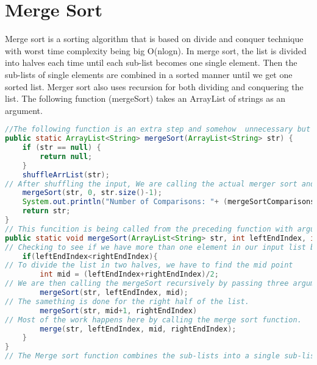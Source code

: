 \documentclass{article}
\begin{document}
\section{Merge Sort}
Merge sort is a sorting algorithm that is based on divide and conquer technique with worst time complexity being big O(nlogn). In merge sort, the list is divided into halves each time until each sub-list becomes one single element. Then the sub-lists of single elements are combined in a sorted manner until we get one sorted list. Merger sort also uses recursion for both dividing and conquering the list. The following function (mergeSort) takes an ArrayList of strings as an argument. 
\begin{lstlisting}[language=Java]
//The following function is an extra step and somehow  unnecessary but I used it to make the program readable and easy to follow. So the function just takes an ArrayList of Strings as an input. 
public static ArrayList<String> mergeSort(ArrayList<String> str) {
    if (str == null) {
        return null;
    }
    shuffleArrList(str);
// After shuffling the input, We are calling the actual merger sort and passing three arguments. The first one is the inputer (ArrayList of strings), the indext of the first element is the second argument and finally the index of the last element of our list. 
    mergeSort(str, 0, str.size()-1);
    System.out.println("Number of Comparisons: "+ (mergeSortComparisonsCount));
    return str;
}
// This funcition is being called from the preceding function with arguments passed to it.
public static void mergeSort(ArrayList<String> str, int leftEndIndex, int rightEndIndex) {
// Checking to see if we have more than one element in our input list by comaring the indices of the first element element to the last index of the last element of the list. 
    if(leftEndIndex<rightEndIndex){
// To divide the list in two halves, we have to find the mid point
        int mid = (leftEndIndex+rightEndIndex)/2;
// We are then calling the mergeSort recursively by passing three arguments, the input list, the leftmost index and the mid point index of the list. We continue calling the mergeSort until the left halve of the list is broken down into a sub list of single element.
        mergeSort(str, leftEndIndex, mid);
// The samething is done for the right half of the list.
        mergeSort(str, mid+1, rightEndIndex)
// Most of the work happens here by calling the merge sort function. 
        merge(str, leftEndIndex, mid, rightEndIndex);
    }      
}
// The Merge sort function combines the sub-lists into a single sub-list in a sorted manner. It takes an ArrayList of Strings as an input as well as leftmost, rightmost and mid indices. 

\end{lstlisting}
\end{document}
